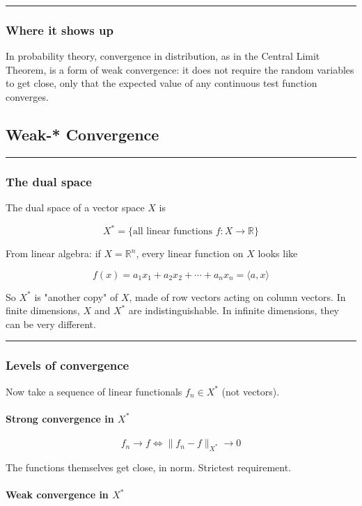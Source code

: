 \hrule

\subsubsection{Where it shows up}

In probability theory, convergence in distribution, as in the Central Limit Theorem, is a form of weak convergence: it does not require the random variables to get close, only that the expected value of any continuous test function converges.

\subsection{Weak-* Convergence}

\hrule

\subsubsection{The dual space}

The dual space of a vector space \(X\) is

\[
X^* = \{\text{all linear functions } f : X \to \mathbb{R}\}
\]

From linear algebra: if \(X = \mathbb{R}^n\), every linear function on \(X\) looks like

\[
f(x) = a_1 x_1 + a_2 x_2 + \cdots + a_n x_n = \langle a, x \rangle
\]

So \(X^*\) is "another copy" of \(X\), made of row vectors acting on column vectors. In finite dimensions, \(X\) and \(X^*\) are indistinguishable. In infinite dimensions, they can be very different.

\hrule

\subsubsection{Levels of convergence}

Now take a sequence of linear functionals \(f_n \in X^*\) (not vectors).

\paragraph{Strong convergence in \(X^*\)}

\[
f_n \to f \iff \|f_n - f\|_{X^*} \to 0
\]

The functions themselves get close, in norm. Strictest requirement.

\paragraph{Weak convergence in \(X^*\)}

